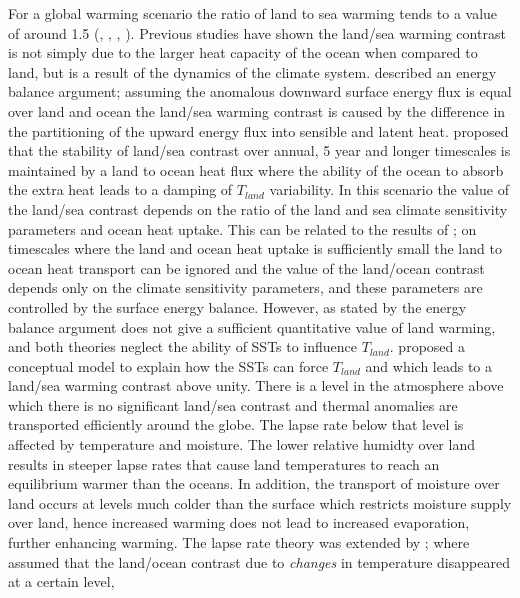 For a global warming scenario the ratio of land to sea warming tends to a value 
of around 1.5  (\citealt{Sutton2007}, \citealt{Lambert2007}, 
\citealt{Compo2008}, \citealt{Dommenget2009}). Previous studies have shown the 
land/sea warming contrast is not simply due to the larger heat capacity of the 
ocean when compared to land, but is a result of the dynamics of the climate 
system.  \citet{Sutton2007} described an energy balance argument; assuming the 
anomalous downward surface energy flux is equal over land and ocean 
\citep{Huntingford2000} the land/sea warming contrast is caused by the 
difference in the partitioning of the upward energy flux into sensible and 
latent heat.  \citet*{Lambert2007} proposed that the stability of land/sea 
contrast over annual, 5 year and longer timescales is maintained by a land to 
ocean heat flux where the ability of the ocean to absorb the extra heat leads to 
a damping of $T_{land}$ variability. In this scenario the value of the land/sea 
contrast depends on the ratio of the land and sea climate sensitivity parameters 
and ocean heat uptake. This can be related to the results of \citet{Sutton2007};
on timescales where the land and ocean heat uptake is sufficiently small the 
land to ocean heat transport can be ignored and the value of the land/ocean 
contrast depends only on the climate sensitivity parameters, and these 
parameters are controlled by the surface energy balance.  However, as stated by 
\citet{Byrne2013a} the energy balance argument does not give a sufficient 
quantitative value of land warming, and both theories neglect the ability of 
SSTs to influence $T_{land}$.  \citet{Joshi2008} proposed a conceptual model to 
explain how the SSTs can force $T_{land}$ and which leads to a land/sea warming 
contrast above unity.  There is a level in the atmosphere above which there is 
no significant land/sea contrast and thermal anomalies are transported 
efficiently around the globe. The lapse rate below that level is affected by 
temperature and moisture. The lower relative humidty over land results in 
steeper lapse rates that cause land temperatures to reach an equilibrium warmer 
than the oceans. In addition, the transport of moisture over land occurs at 
levels much colder than the surface which restricts moisture supply over land, 
hence increased warming does not lead to increased evaporation, further 
enhancing warming. The lapse rate theory was extended by \citet{Byrne2013a}; 
where \citet{Joshi2008} assumed that the land/ocean contrast due to 
\textit{changes} in temperature disappeared at a certain level, 

